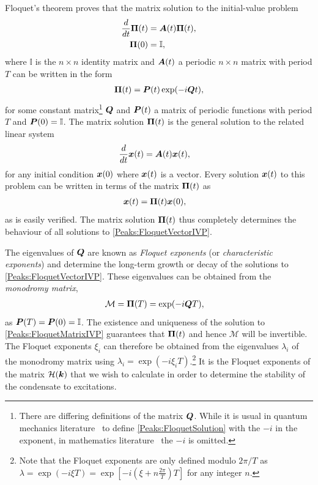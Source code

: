 Floquet's theorem proves that the matrix solution to the initial-value problem
\begin{subequations}
    \label{Peaks:FloquetMatrixIVP}
    \begin{align}
        \frac{d}{dt}\vect{\Pi}(t) &= \vect{A}(t) \vect{\Pi}(t),\\
        \vect{\Pi}(0) &= \mathbb{I},
    \end{align}
\end{subequations}
where $\mathbb{I}$ is the $n \times n$ identity matrix and $\bm{A}(t)$ a periodic $n \times n$ matrix with period $T$ can be written in the form
\begin{align}
    \vect{\Pi}(t) = \vect{P}(t) \exp(-i\vect{Q} t),
    \label{Peaks:FloquetSolution}
\end{align}
for some constant matrix\footnote{There are differing definitions of the matrix $\bm{Q}$. While it is usual in quantum mechanics literature~\citep{Shirley:1965,Hanggi:1998,Garrison:1999} to define \eqref{Peaks:FloquetSolution} with the $-i$ in the exponent,  in mathematics literature~\citep{Moulton:1958,AppliedNonlinearDynamics} the $-i$ is omitted.} $\bm{Q}$ and $\bm{P}(t)$ a matrix of periodic functions with period $T$ and $\bm{P}(0) = \mathbb{I}$. The matrix solution $\bm{\Pi}(t)$ is the general solution to the related linear system
\begin{align}
    \frac{d}{dt}\vect{x}(t) &= \vect{A}(t) \vect{x}(t),
    \label{Peaks:FloquetVectorIVP}
\end{align}
for any initial condition $\bm{x}(0)$ where $\bm{x}(t)$ is a vector. Every solution $\bm{x}(t)$ to this problem can be written in terms of the matrix $\bm{\Pi}(t)$ as
\begin{align}
    \bm{x}(t) &= \bm{\Pi}(t) \bm{x}(0),
\end{align}
as is easily verified. The matrix solution $\bm{\Pi}(t)$ thus completely determines the behaviour of all solutions to \eqref{Peaks:FloquetVectorIVP}.

The eigenvalues of $\bm{Q}$ are known as \emph{Floquet exponents} (or \emph{characteristic exponents}) and determine the long-term growth or decay of the solutions to \eqref{Peaks:FloquetVectorIVP}. These eigenvalues can be obtained from the \emph{monodromy matrix},
\begin{align}
    \label{Peaks:MonodromyMatrix}
    \mathcal{M} &= \vect{\Pi}(T) = \exp(-i\vect{Q} T),
\end{align}
as $\bm{P}(T) = \bm{P}(0) = \mathbb{I}$. The existence and uniqueness of the solution to \eqref{Peaks:FloquetMatrixIVP} guarantees that $\bm{\Pi}(t)$ and hence $\mathcal{M}$ will be invertible. The Floquet exponents $\xi_i$ can therefore be obtained from the eigenvalues $\lambda_i$ of the monodromy matrix using $\lambda_i = \exp(-i\xi_i T)$.\footnote{Note that the Floquet exponents are only defined modulo $2 \pi/T$ as $\displaystyle\lambda = \exp(-i\xi T) = \exp\left[-i \left(\xi + n \frac{2 \pi}{T}\right)T\right]$ for any integer $n$.} It is the Floquet exponents of the matrix $\mathcal{H}(\bm{k})$ that we wish to calculate in order to determine the stability of the condensate to excitations.

